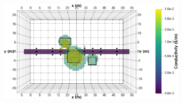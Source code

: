 \documentclass[preprint,authoryear,12pt]{elsarticle}
\begin{document}
\begin{figure}[htp]{}
\begin{center}
\begin{subfigure}{0.55\linewidth}
      \end{subfigure}
      \hspace{-4.0cm}
      \qquad
      \begin{subfigure}{0.55\linewidth}
         \label{fig:InvMod_MultiBlk_StraightTunnel_Charge2_Top_ISO}
         \includegraphics[trim=0cm 0cm 0cm 0cm, clip=true,width=\linewidth]{./figures/Fig22f.png}
      \end{subfigure}
      \vspace{0.2cm}


\end{center}
\end{figure}
\end{document}
